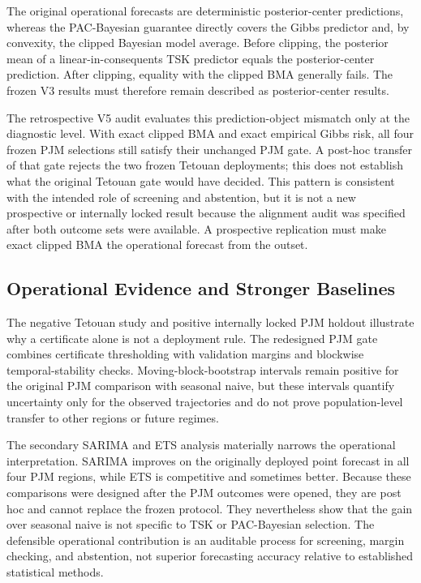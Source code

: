 The original operational forecasts are deterministic posterior-center
predictions, whereas the PAC-Bayesian guarantee directly covers the Gibbs
predictor and, by convexity, the clipped Bayesian model average. Before
clipping, the posterior mean of a linear-in-consequents TSK predictor equals
the posterior-center prediction. After clipping, equality with the clipped
BMA generally fails. The frozen V3 results must therefore remain described as
posterior-center results.

The retrospective V5 audit evaluates this prediction-object mismatch only at
the diagnostic level. With exact clipped BMA and exact empirical Gibbs risk, all four frozen PJM
selections still satisfy their unchanged PJM gate. A post-hoc transfer of
that gate rejects the two frozen Tetouan deployments; this does not
establish what the original Tetouan gate would have decided. This pattern is consistent with the intended role
of screening and abstention, but it is not a new prospective or internally locked result because
the alignment audit was specified after both outcome sets were available. A
prospective replication must make exact clipped BMA the operational forecast
from the outset.

\subsection{Operational Evidence and Stronger Baselines}
The negative Tetouan study and positive internally locked PJM holdout illustrate why a certificate alone is not a deployment rule. The redesigned PJM gate combines certificate thresholding with validation margins and blockwise temporal-stability checks. Moving-block-bootstrap intervals remain positive for the original PJM comparison with seasonal naive, but these intervals quantify uncertainty only for the observed trajectories and do not prove population-level transfer to other regions or future regimes.

The secondary SARIMA and ETS analysis materially narrows the operational interpretation. SARIMA improves on the originally deployed point forecast in all four PJM regions, while ETS is competitive and sometimes better. Because these comparisons were designed after the PJM outcomes were opened, they are post hoc and cannot replace the frozen protocol. They nevertheless show that the gain over seasonal naive is not specific to TSK or PAC-Bayesian selection. The defensible operational contribution is an auditable process for screening, margin checking, and abstention, not superior forecasting accuracy relative to established statistical methods.


